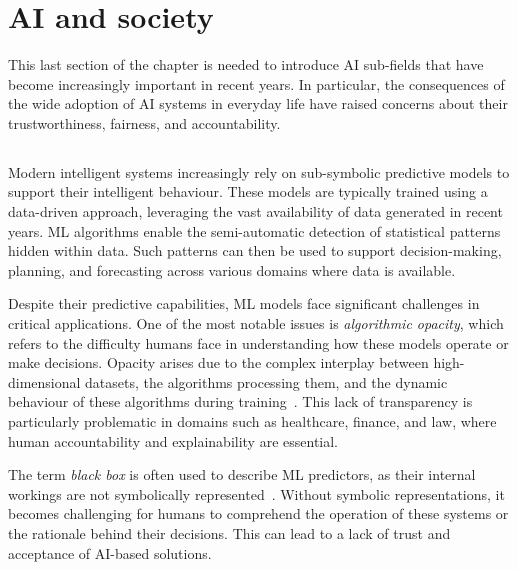 
\section{AI and society}\label{sec:ai-and-society}
%
This last section of the chapter is needed to introduce \gls{AI} sub-fields that have become increasingly important in recent years.
%
In particular, the consequences of the wide adoption of \gls{AI} systems in everyday life have raised concerns about their trustworthiness, fairness, and accountability.
%

\subsection[Explainable AI]{}\label{subsec:xai}
%
Modern intelligent systems increasingly rely on sub-symbolic predictive models to support their intelligent behaviour.
%
These models are typically trained using a data-driven approach, leveraging the vast availability of data generated in recent years.
%
\Gls{ML} algorithms enable the semi-automatic detection of statistical patterns hidden within data.
%
Such patterns can then be used to support decision-making, planning, and forecasting across various domains where data is available.


Despite their predictive capabilities, \gls{ML} models face significant challenges in critical applications.
%
One of the most notable issues is \emph{algorithmic opacity}, which refers to the difficulty humans face in understanding how these models operate or make decisions.
%
Opacity arises due to the complex interplay between high-dimensional datasets, the algorithms processing them, and the dynamic behaviour of these algorithms during training~\cite{DBLP:journals/bigdatasociety/Burrell16}.
%
This lack of transparency is particularly problematic in domains such as healthcare, finance, and law, where human accountability and explainability are essential.


The term \emph{black box} is often used to describe \gls{ML} predictors, as their internal workings are not symbolically represented~\cite{interpretability-lipton-2018}.
%
Without symbolic representations, it becomes challenging for humans to comprehend the operation of these systems or the rationale behind their decisions.
%
This can lead to a lack of trust and acceptance of \gls{AI}-based solutions.


